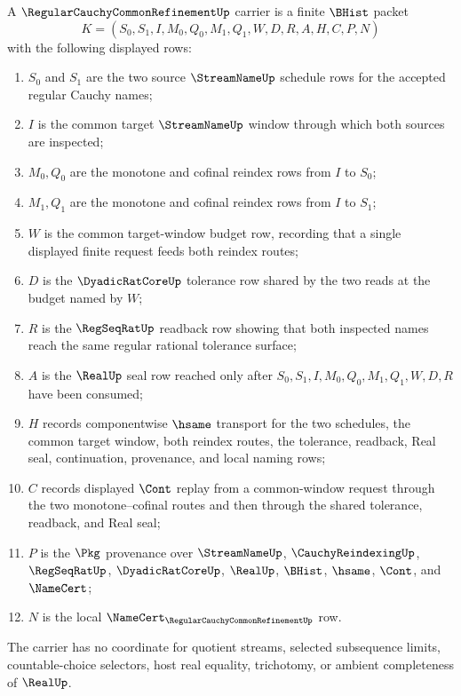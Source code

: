 \begin{definition}
\label{def:regular-cauchy-common-refinement-carrier}
A $\RegularCauchyCommonRefinementUp$ carrier is a finite $\BHist$ packet
$$
K=(S_0,S_1,I,M_0,Q_0,M_1,Q_1,W,D,R,A,H,C,P,N)
$$
with the following displayed rows:
\begin{enumerate}
\item $S_0$ and $S_1$ are the two source $\StreamNameUp$ schedule rows for the accepted regular Cauchy names;
\item $I$ is the common target $\StreamNameUp$ window through which both sources are inspected;
\item $M_0,Q_0$ are the monotone and cofinal reindex rows from $I$ to $S_0$;
\item $M_1,Q_1$ are the monotone and cofinal reindex rows from $I$ to $S_1$;
\item $W$ is the common target-window budget row, recording that a single displayed finite request feeds both reindex routes;
\item $D$ is the $\DyadicRatCoreUp$ tolerance row shared by the two reads at the budget named by $W$;
\item $R$ is the $\RegSeqRatUp$ readback row showing that both inspected names reach the same regular rational tolerance surface;
\item $A$ is the $\RealUp$ seal row reached only after $S_0,S_1,I,M_0,Q_0,M_1,Q_1,W,D,R$ have been consumed;
\item $H$ records componentwise $\hsame$ transport for the two schedules, the common target window, both reindex routes, the tolerance, readback, Real seal, continuation, provenance, and local naming rows;
\item $C$ records displayed $\Cont$ replay from a common-window request through the two monotone--cofinal routes and then through the shared tolerance, readback, and Real seal;
\item $P$ is the $\Pkg$ provenance over $\StreamNameUp$, $\CauchyReindexingUp$, $\RegSeqRatUp$, $\DyadicRatCoreUp$, $\RealUp$, $\BHist$, $\hsame$, $\Cont$, and $\NameCert$;
\item $N$ is the local $\NameCert_{\RegularCauchyCommonRefinementUp}$ row.
\end{enumerate}
The carrier has no coordinate for quotient streams, selected subsequence limits, countable-choice selectors, host real equality, trichotomy, or ambient completeness of $\RealUp$.
\end{definition}

